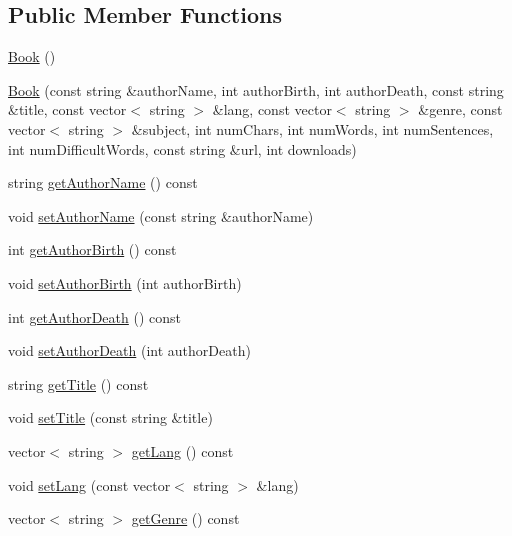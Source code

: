 \subsection*{Public Member Functions}
\begin{DoxyCompactItemize}
\item 
\hyperlink{classbridges_1_1dataset_1_1_book_a951e7d455f2fd89aa05224cbf362e244}{Book} ()
\item 
\hyperlink{classbridges_1_1dataset_1_1_book_a4770a401c2634cb9124c34e462721338}{Book} (const string \&author\+Name, int author\+Birth, int author\+Death, const string \&title, const vector$<$ string $>$ \&lang, const vector$<$ string $>$ \&genre, const vector$<$ string $>$ \&subject, int num\+Chars, int num\+Words, int num\+Sentences, int num\+Difficult\+Words, const string \&url, int downloads)
\item 
string \hyperlink{classbridges_1_1dataset_1_1_book_ad2a683f09b76c7262c3de0215bf2f40d}{get\+Author\+Name} () const
\item 
void \hyperlink{classbridges_1_1dataset_1_1_book_a6a361133defe82e2405af865514a0065}{set\+Author\+Name} (const string \&author\+Name)
\item 
int \hyperlink{classbridges_1_1dataset_1_1_book_aa7ba093d9bf5ee7d757a0b8ff87e06f0}{get\+Author\+Birth} () const
\item 
void \hyperlink{classbridges_1_1dataset_1_1_book_a04c01f0f2f0778f7f5c6bde3f98e0608}{set\+Author\+Birth} (int author\+Birth)
\item 
int \hyperlink{classbridges_1_1dataset_1_1_book_ac4cfa9060e1d9cedbf2143215065a3ed}{get\+Author\+Death} () const
\item 
void \hyperlink{classbridges_1_1dataset_1_1_book_a318b060a519e1889507a20313683ed89}{set\+Author\+Death} (int author\+Death)
\item 
string \hyperlink{classbridges_1_1dataset_1_1_book_a3c4ca2e8bfa41fb502a5343b586dc73f}{get\+Title} () const
\item 
void \hyperlink{classbridges_1_1dataset_1_1_book_a19015494ad6a1d9c75a5c6af63be0dbf}{set\+Title} (const string \&title)
\item 
vector$<$ string $>$ \hyperlink{classbridges_1_1dataset_1_1_book_ae9df8dfb356a6b84977118a64d2982ad}{get\+Lang} () const
\item 
void \hyperlink{classbridges_1_1dataset_1_1_book_aa3b75d6178efc4ddef9b3255dafba3ab}{set\+Lang} (const vector$<$ string $>$ \&lang)
\item 
vector$<$ string $>$ \hyperlink{classbridges_1_1dataset_1_1_book_a26554290984472af3e3dbb9b138e6750}{get\+Genre} () const

\end{DoxyCompactItemize}
